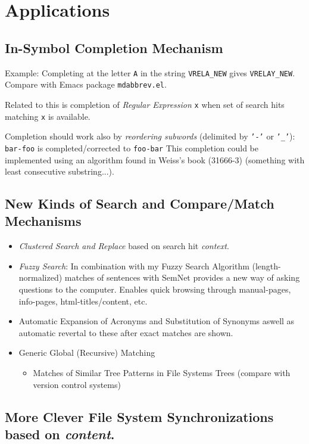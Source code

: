 \documentclass[a4paper,10pt,twocolumn]{article}
\newcommand{\codeC}[1]{\lstset{language=C}\lstinline!#1!}
\newcommand{\codeCxx}[1]{\lstset{language=C++}\lstinline!#1!}
\newcommand{\sn}[0]{SemNet}
\begin{document}
\section{Applications}

\subsection{In-Symbol Completion Mechanism}

Example: Completing at the letter \texttt{A} in the string \codeCxx{VRELA_NEW}
gives \codeC{VRELAY_NEW}. Compare with Emacs package \texttt{mdabbrev.el}.

Related to this is completion of \emph{Regular Expression}
\texttt{x} when
set of search hits matching \texttt{x} is available.

Completion should work also by \emph{reordering subwords} (delimited by
\texttt{'-'} or \texttt{'_'}):
{\centering             \texttt{bar-foo} is completed/corrected to \texttt{foo-bar}
}          This completion could be implemented using an algorithm found in
Weiss's book (31666-3) (something with least consecutive substring...).

\subsection{New Kinds of Search and Compare/Match Mechanisms}

\begin{itemize}
\item \emph{Clustered Search and Replace} based on search hit \emph{context}.
\item \emph{Fuzzy Search}: In combination with my Fuzzy Search Algorithm
  (length-normalized) matches of sentences with \sn{} provides a new way of
  asking questions to the computer. Enables quick browsing through manual-pages,
  info-pages, html-titles/content, etc.
\item Automatic Expansion of Acronyms and Substitution of Synonyms aswell as
  automatic revertal to these after exact matches are shown.
\item Generic Global (Recursive) Matching
  \begin{itemize}
  \item Matches of Similar Tree Patterns in File Systems Trees (compare with
    version control systems)
  \end{itemize}
\end{itemize}

\subsection{More Clever File System Synchronizations based on \emph{content}.}
\end{document}
